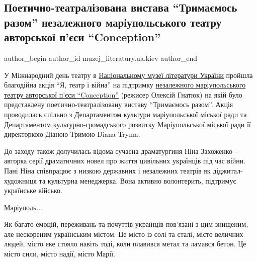  
 
 
 
 

\subsection{Поетично-театралізована вистава \enquote{Тримаємось разом} незалежного маріупольського театру авторської п'єси \enquote{Conception}}
\label{sec:28_03_2023.fb.muzej_literatury.ua.kiev.1.vystava_trymajemos_razom_teatr_conception_mariupol}

\ifcmt
 author_begin
   author_id muzej_literatury.ua.kiev
 author_end
\fi

У Міжнародний день театру в \href{\urlMuzejLiteraturyUkrainyIA}{Національному музеї літератури України} пройшла
благодійна акція \enquote{Я, театр і війна} на підтримку \href{\urlTeatrConceptionMariupolIA}{незалежного маріупольського
театру авторської п'єси \enquote{Conception}} (режисер Олексій Гнатюк) на якій було
представлену поетично-театралізовану виставу \enquote{Тримаємось разом}. Акція
проводилась спільно з Департаментом культури маріупольської міської ради та
Департаментом культурно-громадського розвитку Маріупольської міської ради її
директоркою Діаною Тримою Diana Tryma. 

До заходу також долучилась відома сучасна драматургиня Ніна Захоженко – авторка
серії драматичних новел про життя цивільних українців під час війни. Пані Ніна
співпрацює з низкою державних і незалежних театрів як діджитал-художниця та
культурна менеджерка. Вона активно волонтерить, підтримує українське військо. 

\href{\urlMariupolIA}{Маріуполь}... 

Як багато емоцій, переживань та почуттів українців пов'язані з цим знищеним,
але нескореним українським містом. Це місто із солі та сталі, місто величних
людей, місто яке стояло навіть тоді, коли плавився метал та ламався бетон. Це
місто сили, місто надії, місто Марії. 

